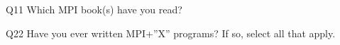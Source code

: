 \begin{description}%
\item{Q11} Which MPI book(s) have you read?%
\item{Q22} Have you ever written MPI+”X” programs? If so, select all that apply.%
\end{description}%
